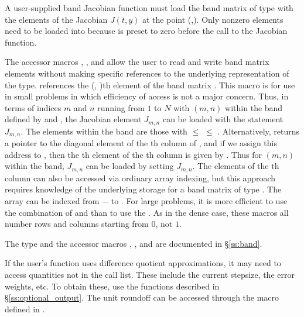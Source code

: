{
  A user-supplied band Jacobian function must load the band matrix 
  of type  with the elements of the Jacobian $J(t,y)$ at the
  point (,).  Only nonzero elements need to be loaded into
   because  is preset to zero before the call to the
  Jacobian function.  

  The accessor macros , , and  
  allow the user to read and write band matrix elements without making specific 
  references to the underlying representation of the  type.
   references the (, )th element of the band matrix .
  This macro is for use in small problems in which efficiency of access is not
  a major concern.  Thus, in terms of indices $m$ and $n$ running from $1$ to
  $N$ with $(m,n)$ within the band defined by  and
  , the Jacobian element $J_{m,n}$ can be loaded with the 
  statement  $J_{m,n}$. The elements within
  the band are those with  $\le$  $\le$ .
  Alternatively,  returns a pointer to the diagonal element of the
  th column of , and if we assign this address to 
  , then the th element of the th column is
  given by .
  Thus for $(m,n)$ within the band, $J_{m,n}$ can be loaded by setting 
    $J_{m,n}$.
  The elements of the th column can also be accessed
  via ordinary array indexing, but this approach requires knowledge of
  the underlying storage for a band matrix of type .  
  The array  can be indexed from $-$ to .
  For large problems, it is more efficient to use the combination of
   and  than to use the
  .  As in the dense case, these macros all number rows
  and columns starting from $0$, not $1$.  

  The  type and the accessor macros , , and
   are documented in \S\ref{ss:band}.

  If the user's  function uses difference quotient approximations,
  it may need to access quantities not in the call list. These include the current
  stepsize, the error weights, etc. To obtain these, use the  functions 
  described in \S\ref{ss:optional_output}. The unit roundoff can be accessed through
  the macro  defined in .
}
